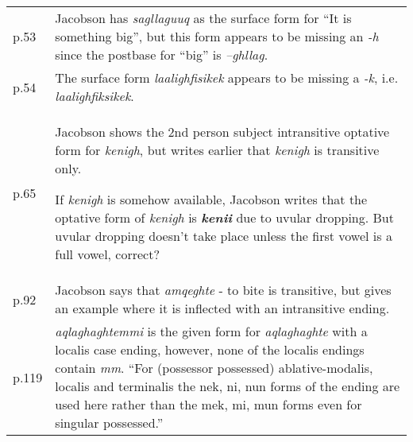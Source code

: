 \documentclass{article}
\begin{document}
\begin{tabular}{p{1cm}p{10.5cm}}
p.53 & Jacobson has \textit{sagllaguuq} as the surface form for ``It is something big'', but this form appears to be missing an \textit{-h} since the postbase for ``big'' is \textit{--ghllag}. \\

p.54 & The surface form \textit{laalighfisikek} appears to be missing a \textit{-k}, i.e. \textit{laalighfiksikek}. \\

p.65 & 	Jacobson shows the 2nd person subject intransitive optative form for \textit{kenigh}, but writes earlier that \textit{kenigh} is transitive only.

If \textit{kenigh} is somehow available, Jacobson writes that the optative form of \textit{kenigh} is \textit{\textbf{kenii}} due to uvular dropping.
%
But uvular dropping doesn't take place unless the first vowel is a full vowel, correct? \\

p.92 & Jacobson says that \textit{amqeghte} - to bite is transitive, but gives an example where it is inflected with an intransitive ending. \\

p.119 & \textit{aqlaghaghtemmi} is the given form for \textit{aqlaghaghte} with a localis case ending, however, none of the localis endings contain \textit{mm}.
%
``For (possessor possessed) ablative-modalis, localis and terminalis the nek, ni, nun forms of the ending are used here rather than the mek, mi, mun forms even for singular possessed.''

\end{tabular}
\end{document}
